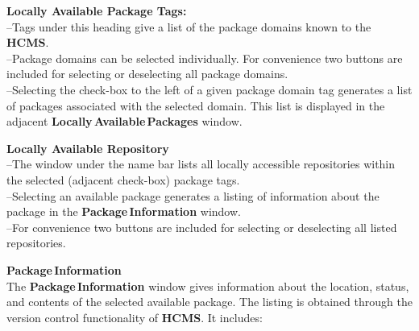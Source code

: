 \documentclass[12pt]{article}
\begin{document}
\begin{description}
\item {\bf Locally Available Package Tags:}\\
--Tags under this heading give a list of the package domains known to the {\bf \small HCMS}.\\
--Package domains can be selected individually. For convenience two buttons are included for selecting or deselecting all package domains.\\
--Selecting the check-box to the left of a given package domain tag generates a list of packages associated with the selected domain. This list is displayed in the adjacent {\bf \small Locally\,Available\,Packages} window.

\item{\bf Locally Available Repository}\\
--The window under the name bar lists all locally accessible repositories within the selected (adjacent check-box) package tags.\\
--Selecting an available package generates a listing of information about the package in the  {\bf \small Package\,Information} window.\\
--For convenience two buttons are included for selecting or deselecting all listed repositories.

\item{\bf Package\,Information}\\
The {\bf \small Package\,Information} window gives information about the location, status, and contents of the selected available package. The listing is obtained through the version control functionality of {\bf \small HCMS}.  It includes:


\end{description}
\end{document}
